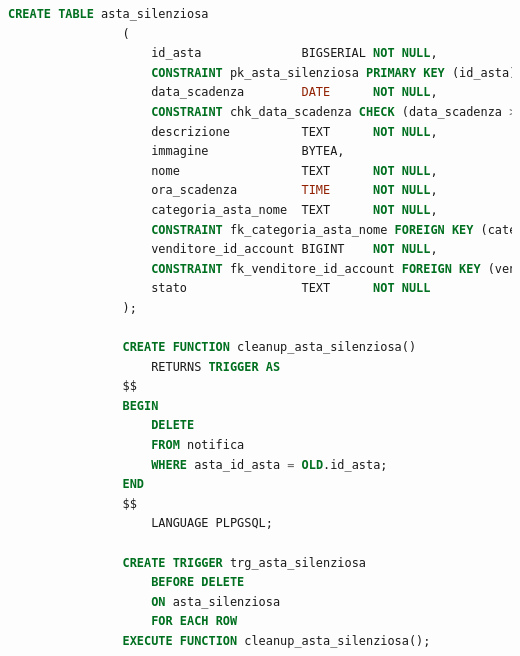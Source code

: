             \begin{lstlisting}[language=SQL, caption=Relazione asta silenziosa]
                CREATE TABLE asta_silenziosa
                (
                    id_asta              BIGSERIAL NOT NULL,
                    CONSTRAINT pk_asta_silenziosa PRIMARY KEY (id_asta),
                    data_scadenza        DATE      NOT NULL,
                    CONSTRAINT chk_data_scadenza CHECK (data_scadenza > NOW()),
                    descrizione          TEXT      NOT NULL,
                    immagine             BYTEA,
                    nome                 TEXT      NOT NULL,
                    ora_scadenza         TIME      NOT NULL,
                    categoria_asta_nome  TEXT      NOT NULL,
                    CONSTRAINT fk_categoria_asta_nome FOREIGN KEY (categoria_asta_nome) REFERENCES categoria_asta (nome) ON UPDATE CASCADE ON DELETE CASCADE,
                    venditore_id_account BIGINT    NOT NULL,
                    CONSTRAINT fk_venditore_id_account FOREIGN KEY (venditore_email) REFERENCES venditore (id_account) ON UPDATE CASCADE ON DELETE CASCADE,
                    stato                TEXT      NOT NULL
                );
                
                CREATE FUNCTION cleanup_asta_silenziosa()
                    RETURNS TRIGGER AS
                $$
                BEGIN
                    DELETE
                    FROM notifica
                    WHERE asta_id_asta = OLD.id_asta;
                END
                $$
                    LANGUAGE PLPGSQL;
                
                CREATE TRIGGER trg_asta_silenziosa
                    BEFORE DELETE
                    ON asta_silenziosa
                    FOR EACH ROW
                EXECUTE FUNCTION cleanup_asta_silenziosa();
            \end{lstlisting}
            
